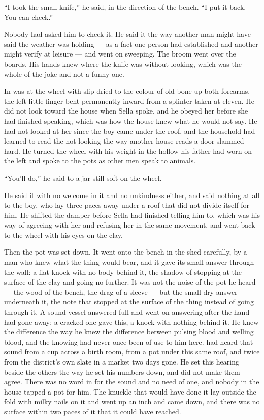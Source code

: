 “I took the small knife,” he said, in the direction of the bench. “I put it back. You can check.”

Nobody had asked him to check it. He said it the way another man might have said the weather was holding --- as a fact one person had established and another might verify at leisure --- and went on sweeping. The broom went over the boards. His hands knew where the knife was without looking, which was the whole of the joke and not a funny one.

In   was at the wheel with slip dried to the colour of old bone up both forearms, the left little finger bent permanently inward from a splinter taken at eleven. He did not look toward the house when Sella spoke, and he obeyed her before she had finished speaking, which was how the house knew what he would not say. He had not looked at her since the boy came under the roof, and the household had learned to read the not-looking the way another house reads a door slammed hard. He turned the wheel with his weight in the hollow his father had worn on the left and spoke to the pots as other men speak to animals.

“You'll do,” he said to a jar still soft on the wheel.

He said it with no welcome in it and no unkindness either, and said nothing at all to the boy, who lay three paces away under a roof that did not divide itself for him. He shifted the damper before Sella had finished telling him to, which was his way of agreeing with her and refusing her in the same movement, and went back to the wheel with his eyes on the clay.

Then the pot was set down. It went onto the bench in the shed carefully, by a man who knew what the thing would bear, and it gave its small answer through the wall: a flat knock with no body behind it, the shadow of  stopping at the surface of the clay and going no further. It was not the noise of the pot he heard --- the wood of the bench, the drag of a sleeve --- but the small dry answer underneath it, the note that stopped at the surface of the thing instead of going through it. A sound vessel answered full and went on answering after the hand had gone away; a cracked one gave this, a knock with nothing behind it. He knew the difference the way he knew the difference between pulsing blood and welling blood, and the knowing had never once been of use to him here.  had heard that sound from a cup across a birth room, from a pot under this same roof, and twice from the district's own slate in a market two days gone. He set this hearing beside the others the way he set his numbers down, and did not make them agree. There was no word in  for the sound and no need of one, and nobody in the house tapped a pot for him. The knuckle that would have done it lay outside the fold with milky nails on it and went up an inch and came down, and there was no surface within two paces of it that it could have reached.

